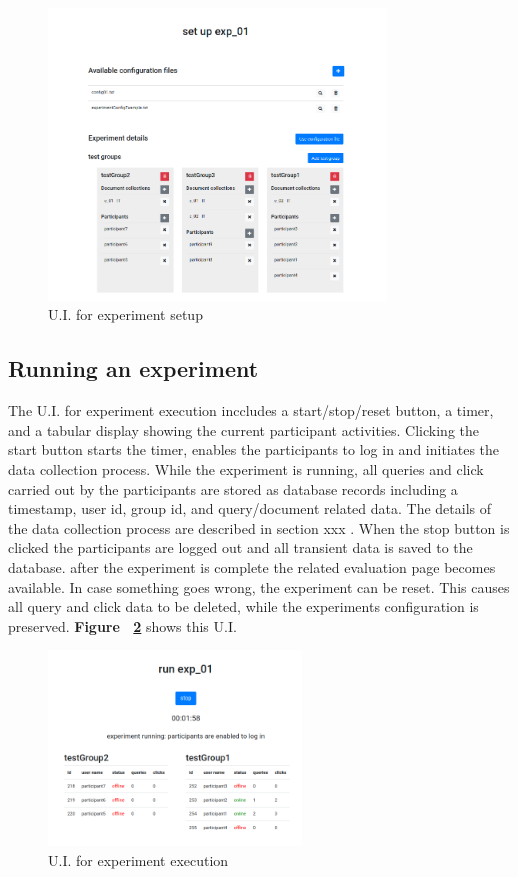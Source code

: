 \documentclass[]{usiinfbachelorproject}
\begin{document}
\begin{figure} [h]
\centering
\includegraphics[width=0.8\textwidth]{img/setup}
\caption{U.I. for experiment setup}
\label{fig:setup}
\end{figure}

\subsection{Running an experiment}

The U.I. for experiment execution inccludes a start/stop/reset button, a timer, and a tabular display 
showing the current participant activities. Clicking the start button starts the timer, enables the participants to log in and
initiates the data collection process. While the experiment is running, all queries and click carried out by the
participants are stored as database records including a timestamp, user id, group id, and query/document related data.
The details of the data collection process are described in section xxx .
When the stop button is clicked the participants are logged out and all transient data is saved to the database.
after the experiment is complete the related evaluation page becomes available.
In case something goes wrong, the experiment can be reset. This causes all query and click data to be deleted, while the
experiments configuration is preserved.
\textbf{Figure ~\ref{fig:run}} shows this U.I.

\begin{figure} [h]
\centering
\includegraphics[width=0.6\textwidth]{img/run}
\caption{U.I. for experiment execution}
\label{fig:run}
\end{figure}
\end{document}
